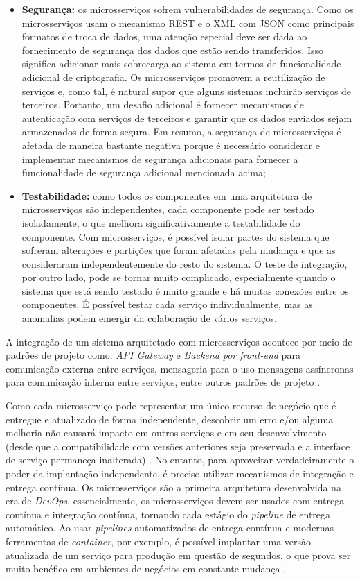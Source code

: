 \begin{itemize}
    \item \textbf{Segurança:} os microsserviços sofrem vulnerabilidades de segurança. Como os microsserviços usam o mecanismo \acrshort{REST} e o \acrshort{XML} com \acrshort{JSON} como principais formatos de troca de dados, uma atenção especial deve ser dada ao fornecimento de segurança dos dados que estão sendo transferidos. Isso significa adicionar mais sobrecarga ao sistema em termos de funcionalidade adicional de criptografia. Os microsserviços promovem a reutilização de serviços e, como tal, é natural supor que alguns sistemas incluirão serviços de terceiros. Portanto, um desafio adicional é fornecer mecanismos de autenticação com serviços de terceiros e garantir que os dados enviados sejam armazenados de forma segura. Em resumo, a segurança de microsserviços é afetada de maneira bastante negativa porque é necessário considerar e implementar mecanismos de segurança adicionais para fornecer a funcionalidade de segurança adicional mencionada acima;
    \item \textbf{Testabilidade:} como todos os componentes em uma arquitetura de microsserviços são independentes, cada componente pode ser testado isoladamente, o que melhora significativamente a testabilidade do componente. Com microsserviços, é possível isolar partes do sistema que sofreram alterações e partições que foram afetadas pela mudança e que as consideraram independentemente do resto do sistema. O teste de integração, por outro lado, pode se tornar muito complicado, especialmente quando o sistema que está sendo testado é muito grande e há muitas conexões entre os componentes. É possível testar cada serviço individualmente, mas as anomalias podem emergir da colaboração de vários serviços.
\end{itemize}

A integração de um sistema arquitetado com microsserviços acontece por meio de padrões de projeto como: \textit{\acrshort{API} Gateway} e \textit{Backend por front-end} para comunicação externa entre serviços, mensageria para o uso mensagens assíncronas para comunicação interna entre serviços, entre outros padrões de projeto \cite{Richardson2016}.

Como cada microsserviço pode representar um único recurso de negócio que é entregue e atualizado de forma independente, descobrir um erro e/ou alguma melhoria não causará impacto em outros serviços e em seu desenvolvimento (desde que a compatibilidade com versões anteriores seja preservada e a interface de serviço permaneça inalterada) \cite{Dragoni2016}. No entanto, para aproveitar verdadeiramente o poder da implantação independente, é preciso utilizar mecanismos de integração e entrega contínua. Os microsserviços são a primeira arquitetura desenvolvida na era de \textit{DevOps}, essencialmente, os microsserviços devem ser usados com entrega contínua e integração contínua, tornando cada estágio do \textit{pipeline} de entrega automático. Ao usar \textit{pipelines} automatizados de entrega contínua e modernas ferramentas de \textit{container}, por exemplo, é possível implantar uma versão atualizada de um serviço para produção em questão de segundos, o que prova ser muito benéfico em ambientes de negócios em constante mudança \cite{Dragoni2016}.

